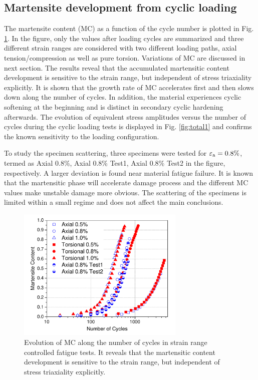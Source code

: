 \documentclass[preprint,5p,twocolumn,10pt,sort&compress]{elsarticle}
\begin{document}
\subsection{Martensite development from cyclic loading}

The martensite content (MC) as a function of the cycle number is plotted in Fig. \ref{fig:total2}.  In the figure, only the values after loading cycles are summarized and three different strain ranges are considered with two different loading paths, axial tension/compression as well as pure torsion. Variations of  MC are discussed in next section. The results reveal that the accumulated martensitic content development is sensitive to the strain range, but independent of stress triaxiality explicitly. It is shown that the growth rate of MC accelerates first and then slows down along the number of cycles. In addition, the material experiences cyclic softening at the beginning and is distinct in secondary cyclic hardening afterwards. The evolution of equivalent stress amplitudes versus the number of cycles during the cyclic loading tests is displayed in Fig. \ref{fig:total1} and confirms the known sensitivity to the loading configuration.

To study the specimen scattering, three specimens were tested for $\varepsilon_{\rm a}=0.8\%$, termed as Axial 0.8\%, Axial 0.8\% Test1, Axial 0.8\% Test2 in the figure, respectively. A larger deviation is found near material fatigue failure.  It is known that the martensitic phase will accelerate damage process and the different MC values make unstable damage more obvious. The scattering of the specimens is limited within a small regime and does not affect the main conclusions.

\begin{figure}[!h]
  \begin{center}
  \includegraphics[width=8cm]{total2.pdf}
  \caption{Evolution of MC along the number of cycles in strain range controlled fatigue tests. It reveals that the martensitic content development is sensitive to the strain range, but independent of stress triaxiality explicitly.}
  \label{fig:total2}
  \end{center}
\end{figure}
\end{document}
